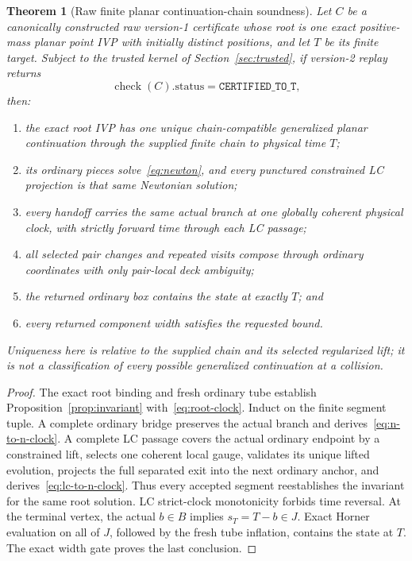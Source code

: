 \documentclass[11pt]{article}
\newtheorem{theorem}{Theorem}[section]
\begin{document}
\begin{theorem}[Raw finite planar continuation-chain soundness]
\label{thm:chain}
Let $C$ be a canonically constructed raw version-1 certificate whose root is
one exact positive-mass planar point IVP with initially distinct positions,
and let $T$ be its finite target.  Subject to the trusted kernel of
Section~\ref{sec:trusted}, if version-2 replay returns
\[
 \operatorname{check}(C).\mathrm{status}
 =\texttt{CERTIFIED\_TO\_T},
\]
then:
\begin{enumerate}[label=(\roman*)]
\item the exact root IVP has one unique chain-compatible generalized planar
      continuation through the supplied finite chain to physical time $T$;
\item its ordinary pieces solve~\eqref{eq:newton}, and every punctured
      constrained LC projection is that same Newtonian solution;
\item every handoff carries the same actual branch at one globally coherent
      physical clock, with strictly forward time through each LC passage;
\item all selected pair changes and repeated visits compose through ordinary
      coordinates with only pair-local deck ambiguity;
\item the returned ordinary box contains the state at exactly $T$; and
\item every returned component width satisfies the requested bound.
\end{enumerate}
Uniqueness here is relative to the supplied chain and its selected regularized
lift; it is not a classification of every possible generalized continuation
at a collision.
\end{theorem}

\begin{proof}
The exact root binding and fresh ordinary tube establish
Proposition~\ref{prop:invariant} with~\eqref{eq:root-clock}.  Induct on the
finite segment tuple.  A complete ordinary bridge preserves the actual branch
and derives~\eqref{eq:n-to-n-clock}.  A complete LC passage covers the actual
ordinary endpoint by a constrained lift, selects one coherent local gauge,
validates its unique lifted evolution, projects the full separated exit into
the next ordinary anchor, and derives~\eqref{eq:lc-to-n-clock}.  Thus every
accepted segment reestablishes the invariant for the same root solution.
LC strict-clock monotonicity forbids time reversal.  At the terminal vertex,
the actual $b\in B$ implies $s_T=T-b\in J$.  Exact Horner evaluation on all of
$J$, followed by the fresh tube inflation, contains the state at $T$.
The exact width gate proves the last conclusion.
\end{proof}
\end{document}
